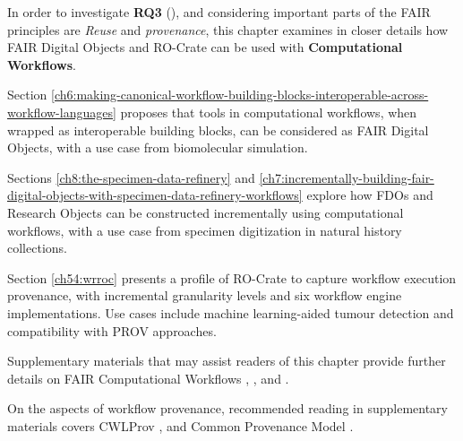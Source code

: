 In order to investigate \textbf{RQ3} (), and considering important parts of the FAIR principles are \emph{Reuse} and \emph{provenance}, this chapter examines in closer details how FAIR Digital Objects and RO-Crate can be used with \textbf{Computational Workflows}. 

Section \vref{ch6:making-canonical-workflow-building-blocks-interoperable-across-workflow-languages} proposes that tools in computational \glspl{workflow}, when wrapped as interoperable building blocks, can be considered as FAIR Digital Objects, with a use case from biomolecular simulation.

Sections \vref{ch8:the-specimen-data-refinery} and \vref{ch7:incrementally-building-fair-digital-objects-with-specimen-data-refinery-workflows} explore how FDOs and Research Objects can be constructed incrementally using computational workflows, with a use case from specimen digitization in natural history collections.

Section \vref{ch54:wrroc} presents a profile of RO-Crate to capture workflow execution provenance, with incremental granularity levels and six workflow engine implementations. Use cases include machine learning-aided tumour detection and compatibility with PROV approaches. 

Supplementary materials that may assist readers of this chapter provide further details on FAIR Computational Workflows \cite{Goble 2020},  \cite{Goble 2021},  \cite{Crusoe 2022} and  \cite{Brack 2022a}. 

On the aspects of workflow provenance, recommended reading in supplementary materials covers CWLProv \cite{Khan 2019},  \cite{De Geest 2022} and Common Provenance Model \cite{Wittner 2020,Wittner 2023a}.
